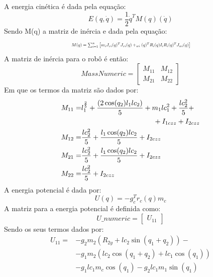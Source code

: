 \documentclass[a4paper,twocolumn,final,11pt]{article}
\begin{document}
A energia cinética é dada pela equação:
\begin{equation}
    E(q,\dot{q})=\frac{1}{2}\dot{q}^{T}M(q)(\dot{q})
\end{equation}
Sendo M(q) a matriz de inércia e dada pela equação:
\begin{equation*}
\resizebox{.5\textwidth}{!}{
$M(q)= \sum_{i=1}^{n} \left[m_iJ_{vi}(q)^TJ_{vi}(q)+_{wi}(q)^TR_i(q)I_iR_i(q)^TJ_{wi}(q)\right]$}
\end{equation*}
A matriz de inércia para o robô é então: 
\begin{equation}
MassNumeric=
\begin{bmatrix}
M_{11} & M_{12} \\
M_{21} & M_{22}
\end{bmatrix}
\end{equation}
Em que os termos da matriz são dados por:
\begin{align*}
    M_{11} = & l_1^{\frac{2}{5}}+\frac{(2\cos(q_2)l_1lc_2)}{5}+m_1lc_1^2+\frac{lc_2^2}{5}+\\
    & \hspace{3.6cm} +I_{1czz}+I_{2czz} \\
    M_{12} = & \frac{lc_2^2}{5}+\frac{l_1\cos(q_2)lc_2}{5} + I_{2czz}\\
    M_{21} = & \frac{lc_2^2}{5} + \frac{l_1\cos(q_2)lc_2}{5}+ I_{2czz}\\
    M_{22} = & \frac{lc_2^2}{5} + I_{2czz}
\end{align*}
A energia potencial é dada por:
\begin{equation}
    U(q)=-g_{c}^Tr_c(q)m_c
\end{equation}
A matriz para a energia potencial é definida como:
\begin{equation}
U\_numeric=
\begin{bmatrix}
U_{11} 
\end{bmatrix}
\end{equation}
Sendo os seus termos dados por:
\begin{align*}
    U_{11} = & -g_2m_2(R_{2y}+lc_2\sin(q_1+q_2))-\\
    &  -g_1m_2(lc_2\cos(q_1+q_2)+lc_1\cos(q_1))\\
    &-g_1lc_1m_c\cos(q_1)-g_2lc_1m_1\sin(q_1)
\end{align*}
\end{document}
